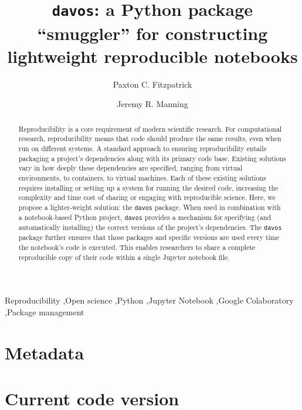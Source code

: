 \documentclass[preprint,12pt,a4paper]{elsarticle}
\begin{document}
\begin{frontmatter}

\title{\texttt{davos}: a Python package ``smuggler'' for constructing
  lightweight reproducible notebooks}
\author{Paxton C. Fitzpatrick}
\author{Jeremy R. Manning}
\address{Department of Psychological and Brain Sciences\\Dartmouth College, Hanover, NH 03755}


\begin{abstract}
  Reproducibility is a core requirement of modern scientific research.
  For computational research, reproducibility means that code should
  produce the same results, even when run on different systems.  A
  standard approach to ensuring reproducibility entails packaging a
  project's dependencies along with its primary code base.  Existing
  solutions vary in how deeply these dependencies are specified,
  ranging from virtual environments, to containers, to virtual
  machines.  Each of these existing solutions requires installing or
  setting up a system for running the desired code, increasing the
  complexity and time cost of sharing or engaging with reproducible
  science. Here, we propose a lighter-weight solution: the
  \texttt{davos} package.  When used in combination with a
  notebook-based Python project, \texttt{davos} provides a mechanism
  for specifying (and automatically installing) the correct versions
  of the project's dependencies.  The \texttt{davos} package further
  ensures that those packages and specific versions are used every
  time the notebook's code is executed.  This enables researchers to
  share a complete reproducible copy of their code within a single
  Jupyter notebook file.
\end{abstract}


\begin{keyword}
  Reproducibility \sep Open science \sep Python \sep Jupyter Notebook
  \sep Google Colaboratory \sep Package management
\end{keyword}

\end{frontmatter}


\section*{Metadata}

\section*{Current code version}
\end{document}
